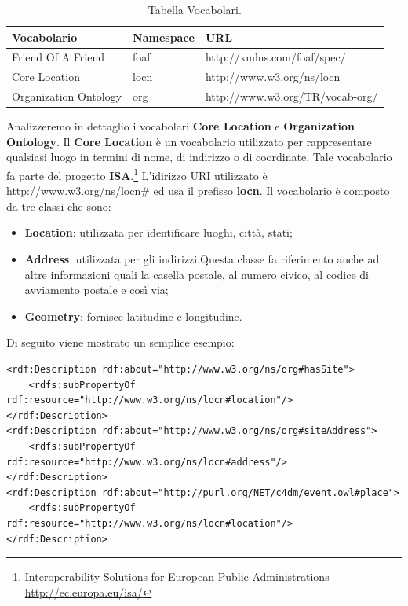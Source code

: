 \documentclass[a4paper,11pt]{article}
\begin{document}
\begin{table}[!htbp]
\begin{center}				
\begin{tabular}{|>{\small}l|>{\small}l|>{\small}l|}
	\hline	\textbf{Vocabolario} & \textbf{Namespace} & \textbf{URL}\\				
	\hline	Friend Of A Friend & foaf & http://xmlns.com/foaf/spec/\\
	\hline	Core Location & locn & http://www.w3.org/ns/locn\\
	\hline	Organization Ontology & org & http://www.w3.org/TR/vocab-org/\\
	\hline			
\end{tabular}	
\caption{Tabella Vocabolari.}	
\end{center}	
\end{table}
Analizzeremo in dettaglio i vocabolari \textbf{Core Location} e \textbf{Organization Ontology}.
Il \textbf{Core Location} è un vocabolario utilizzato per rappresentare qualsiasi luogo in termini di nome, di indirizzo o di coordinate. Tale vocabolario fa parte del progetto \textbf{ISA}.\footnote{Interoperability Solutions for European Public Administrations \url{http://ec.europa.eu/isa/}} L'idirizzo URI utilizzato è \url{http://www.w3.org/ns/locn\#} ed usa il prefisso \textbf{locn}. \newline Il vocabolario è composto da tre classi che sono:
\begin{itemize}
	\item \textbf{Location}: utilizzata per identificare luoghi, città, stati;  
	\item \textbf{Address}: utilizzata per gli indirizzi.Questa classe fa riferimento anche ad altre informazioni quali la casella postale, al numero civico, al codice di avviamento postale e così via;
	\item \textbf{Geometry}: fornisce latitudine e longitudine.
\end{itemize} 
Di seguito viene mostrato un semplice esempio:
\begin{lstlisting}[style=htmlcssjs]
<rdf:Description rdf:about="http://www.w3.org/ns/org#hasSite">
	<rdfs:subPropertyOf rdf:resource="http://www.w3.org/ns/locn#location"/>
</rdf:Description>
<rdf:Description rdf:about="http://www.w3.org/ns/org#siteAddress">
	<rdfs:subPropertyOf rdf:resource="http://www.w3.org/ns/locn#address"/>
</rdf:Description>
<rdf:Description rdf:about="http://purl.org/NET/c4dm/event.owl#place">
	<rdfs:subPropertyOf rdf:resource="http://www.w3.org/ns/locn#location"/>
</rdf:Description>
\end{lstlisting}
\end{document}
